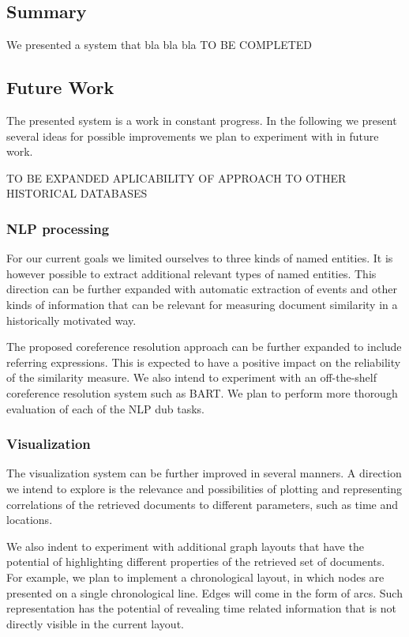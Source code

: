 \subsection {Summary}
\label{sec:summary}

We presented a system that bla bla bla
TO BE COMPLETED


\subsection {Future Work}
\label{sec:future_work}
The presented system is a work in constant progress. 
In the following we present several ideas for possible improvements we plan to experiment with in future work.

TO BE EXPANDED
APLICABILITY OF APPROACH TO OTHER HISTORICAL DATABASES

\subsubsection{NLP processing}
For our current goals we limited ourselves to three kinds of named entities. 
It is however possible to extract additional relevant types of named entities. 
This direction can be further expanded with automatic extraction of events and other kinds of information that can be relevant for measuring 
document similarity in a historically motivated way.  

The proposed coreference resolution approach can be further expanded to include referring expressions. 
This is expected to have a positive impact on the reliability of the similarity measure. 
We also intend to experiment with an off-the-shelf coreference resolution system such as BART.
We plan to perform more thorough evaluation of each of the NLP dub tasks. 


\subsubsection{Visualization}
The visualization system can be further improved in several manners. 
A direction we intend to explore is the relevance and possibilities of plotting and representing correlations of the retrieved documents 
to different parameters, such as time and locations.

We also indent to experiment with additional graph layouts that have the potential of highlighting different properties of the 
retrieved set of documents. For example, we plan to implement a chronological layout, in which nodes are presented on a single chronological 
line. Edges will come in the form of arcs. Such representation has the potential of revealing time related information that is not 
directly visible in the current layout. 

